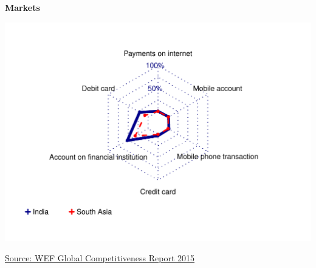 \documentclass{article}\usepackage[]{graphicx}\usepackage[]{color}
\makeatletter
\def\maxwidth{ %
  \ifdim\Gin@nat@width>\linewidth
    \linewidth
  \else
    \Gin@nat@width
  \fi
}
\makeatother
\begin{document}
{\color{blue!50!white}\noindent\makebox[\linewidth]{\rule{18cm}{0.3pt}}} %

\vspace{2ex}
\begin{minipage}[b]{0.875\textwidth}
  \vspace{2ex}
  \begin{flushleft}  
    {\color{blue!20!black} \textbf{\LARGE Markets}}
  \end{flushleft}
  \vspace{0.5cm}
  \begin{minipage}[c]{0.48\textwidth} %
    \vspace*{-0.6cm}


{\centering \includegraphics[width=\maxwidth]{figure/radar_chart_Markets-1} 

}



    \vspace*{-0.6cm} 
    \hspace*{0.3cm} \raggedright\footnotesize{\href{http://www.weforum.org/global-competitiveness-report-2015-2016}{Source: WEF Global Competitiveness Report 2015}}
  \end{minipage}
  \begin{minipage}[c]{0.50\textwidth} %
    \centering
\end{minipage}
\end{minipage}
\end{document}
